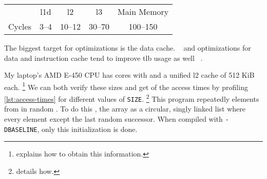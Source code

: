 \begin{center}\begin{tabular}{ r c c c c }
   \toprule
          & \gls{l1d} & \gls{l2} & \gls{l3} & Main Memory \\
   \cmidrule[\lightrulewidth](l){2-5}
   Cycles & 3--4      & 10--12   & 30--70   & 100--150 \\
   \bottomrule
\end{tabular}\end{center}

%

The biggest target for optimizations is the data cache.  ~\cite[31]{drepper2007} and optimizations for data and instruction cache
tend to improve \gls{tlb} usage as well%
~\cite[\href{https://youtu.be/WDIkqP4JbkE?t=11m53s}{11:53}]{scott-meyers-talk}.

My laptop's AMD E-450 CPU has cores with  and a unified \gls{l2} cache of 512 KiB each.%
\footnote{ explains how to obtain this information.}
We can both verify these sizes and get  of the access times by profiling
\cref{lst:access-times}
for different values of \texttt{SIZE}.%
\footnote{ details how.}
This program repeatedly  elements
from 
in random .
To do this
, the array  as a
circular, singly linked list where every element except the last 
random successor.  When compiled with \texttt{-DBASELINE}, only this
initialization is done.

